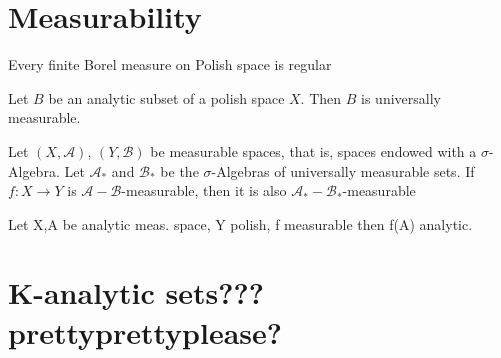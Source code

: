 \documentclass[10pt, a4paper, titlepage]{article}
\numberwithin{equation}{section}
\begin{document}
\section{Measurability}

\begin{definition}[$\mu$-Measurable]
	
\end{definition}

\begin{definition}
	
\end{definition}

\begin{theorem}
	Every finite Borel measure on Polish space is regular
\end{theorem}

\begin{theorem}
	Let $B$ be an analytic subset of a polish space $X$. Then $B$ is universally measurable.
\end{theorem}

\begin{theorem}
	Let $(X,\mathcal{A})$,  $\left( Y, \mathcal{B} \right) $ be measurable spaces, that is, spaces endowed with a $\sigma$-Algebra.  
	Let $\mathcal{A}_*$ and $\mathcal{B}_*$ be the $\sigma$-Algebras of universally measurable sets.
	If  $f:X \to Y$ is  $\mathcal{A}- \mathcal{B}$-measurable, then it is also $\mathcal{A}_*-\mathcal{B}_*$-measurable
\end{theorem}


\begin{definition}
	
\end{definition}

\begin{theorem}
	Let X,A be analytic meas. space, Y polish, f measurable then f(A) analytic.
\end{theorem}

\section{K-analytic sets??? prettyprettyplease?}

































\vspace{\fill}
\nocite{*}
\printbibliography{}
\end{document}
